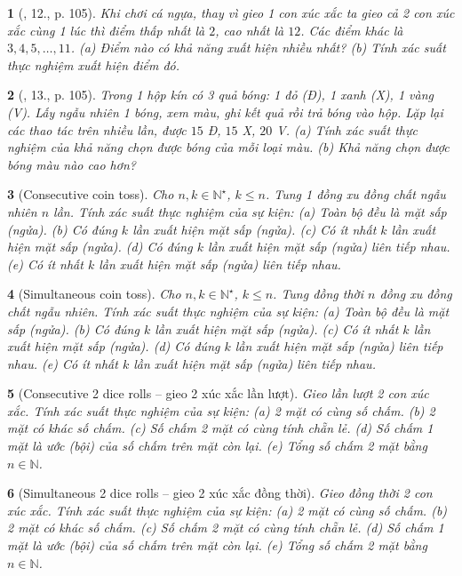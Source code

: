 \documentclass{article}
\newtheorem{baitoan}{}
\begin{document}
\begin{baitoan}[\cite{Tuyen_Toan_6}, 12., p. 105]
	Khi chơi cá ngựa, thay vì gieo 1 con xúc xắc ta gieo cả 2 con xúc xắc cùng 1 lúc thì điểm thấp nhất là $2$, cao nhất là $12$. Các điểm khác là $3,4,5,\ldots,11$. (a) Điểm nào có khả năng xuất hiện nhiều nhất? (b) Tính xác suất thực nghiệm xuất hiện điểm đó.
\end{baitoan}

\begin{baitoan}[\cite{Tuyen_Toan_6}, 13., p. 105]
	Trong 1 hộp kín có 3 quả bóng: 1 đỏ (Đ), 1 xanh (X), 1 vàng (V). Lấy ngẫu nhiên 1 bóng, xem màu, ghi kết quả rồi trả bóng vào hộp. Lặp lại các thao tác trên nhiều lần, được $15$ Đ, $15$ X, $20$ V. (a) Tính xác suất thực nghiệm của khả năng chọn được bóng của mỗi loại màu. (b) Khả năng chọn được bóng màu nào cao hơn?
\end{baitoan}

\begin{baitoan}[Consecutive coin toss]
	Cho $n,k\in\mathbb{N}^\star$, $k\le n$. Tung 1 đồng xu đồng chất ngẫu nhiên $n$ lần. Tính xác suất thực nghiệm của sự kiện: (a) Toàn bộ đều là mặt sấp (ngửa). (b) Có đúng $k$ lần xuất hiện mặt sấp (ngửa). (c) Có ít nhất $k$ lần xuất hiện mặt sấp (ngửa). (d) Có đúng $k$ lần xuất hiện mặt sấp (ngửa) liên tiếp nhau. (e) Có ít nhất $k$ lần xuất hiện mặt sấp (ngửa) liên tiếp nhau.
\end{baitoan}

\begin{baitoan}[Simultaneous coin toss]
	Cho $n,k\in\mathbb{N}^\star$, $k\le n$. Tung đồng thời $n$ đồng xu đồng chất ngẫu nhiên. Tính xác suất thực nghiệm của sự kiện: (a) Toàn bộ đều là mặt sấp (ngửa). (b) Có đúng $k$ lần xuất hiện mặt sấp (ngửa). (c) Có ít nhất $k$ lần xuất hiện mặt sấp (ngửa). (d) Có đúng $k$ lần xuất hiện mặt sấp (ngửa) liên tiếp nhau. (e) Có ít nhất $k$ lần xuất hiện mặt sấp (ngửa) liên tiếp nhau.
\end{baitoan}

\begin{baitoan}[Consecutive 2 dice rolls -- gieo 2 xúc xắc lần lượt]
	Gieo lần lượt 2 con xúc xắc. Tính xác suất thực nghiệm của sự kiện: (a) 2 mặt có cùng số chấm. (b) 2 mặt có khác số chấm. (c) Số chấm 2 mặt có cùng tính chẵn lẻ. (d) Số chấm 1 mặt là ước (bội) của số chấm trên mặt còn lại. (e) Tổng số chấm 2 mặt bằng $n\in\mathbb{N}$.
\end{baitoan}

\begin{baitoan}[Simultaneous 2 dice rolls -- gieo 2 xúc xắc đồng thời]
	Gieo đồng thời 2 con xúc xắc. Tính xác suất thực nghiệm của sự kiện: (a) 2 mặt có cùng số chấm. (b) 2 mặt có khác số chấm. (c) Số chấm 2 mặt có cùng tính chẵn lẻ. (d) Số chấm 1 mặt là ước (bội) của số chấm trên mặt còn lại. (e) Tổng số chấm 2 mặt bằng $n\in\mathbb{N}$.
\end{baitoan}
\end{document}
